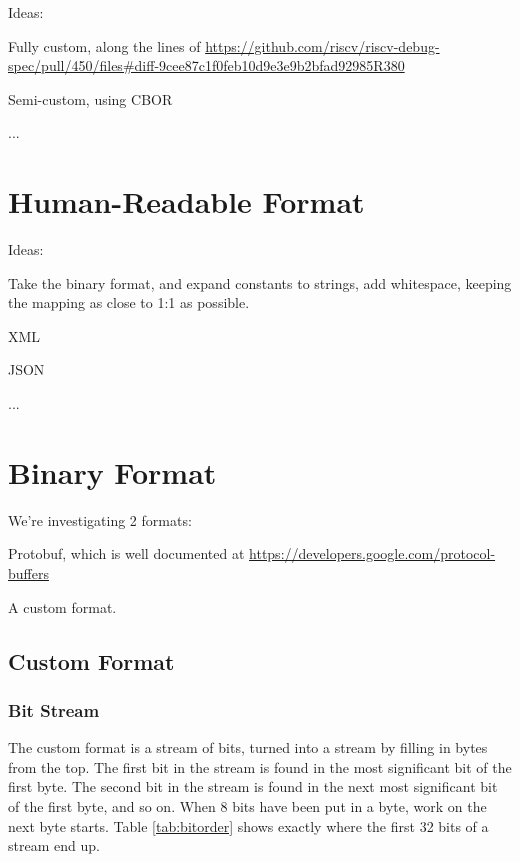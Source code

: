 \begin{steps}{Ideas:}
\item Fully custom, along the lines of
    \url{https://github.com/riscv/riscv-debug-spec/pull/450/files#diff-9cee87c1f0feb10d9e3e9b2bfad92985R380}
\item Semi-custom, using CBOR
\item ...
\end{steps}

\chapter{Human-Readable Format}

\begin{steps}{Ideas:}
\item Take the binary format, and expand constants to strings, add whitespace,
keeping the mapping as close to 1:1 as possible.
\item XML
\item JSON
\item ...
\end{steps}

\chapter{Binary Format}

\begin{steps}{We're investigating 2 formats:}
    \item Protobuf, which is well documented at \url{https://developers.google.com/protocol-buffers}
    \item A custom format.
\end{steps}

\section{Custom Format}

\subsection{Bit Stream}

The custom format is a stream of bits, turned into a stream by filling in
bytes from the top. The first bit in the stream is found in the most
significant bit of the first byte. The second bit in the stream is found in
the next most significant bit of the first byte, and so on. When 8 bits have
been put in a byte, work on the next byte starts. Table \ref{tab:bitorder}
shows exactly where the first 32 bits of a stream end up.


